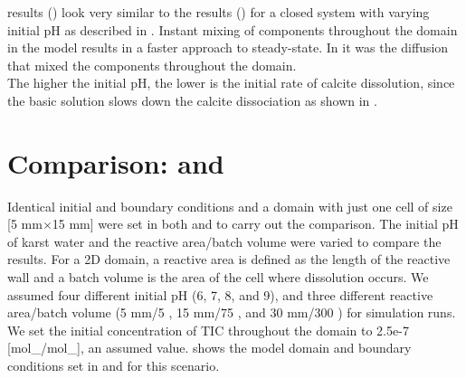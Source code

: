 \MATLAB results () look very similar to the \DuMuX results () 
for a closed system with varying initial pH as described in . Instant mixing of components throughout the domain 
in the \MATLAB model results in a faster approach to steady-state. In \DuMuX it was the diffusion that mixed the components throughout the domain. \\

The higher the initial pH, the lower is the initial rate of calcite dissolution, since the basic solution slows down the calcite dissociation 
as shown in .

\section{Comparison: \DuMuX and \MATLAB} \label{sec:dvm}
Identical initial and boundary conditions and a domain with just one cell of size [5 mm$\times$15 mm] were set in both \MATLAB and \DuMuX 
to carry out the comparison. The initial pH of karst water and the reactive area/batch volume were varied to compare the results. 
For a 2D domain, a reactive area is defined as the length of the reactive wall and a batch volume is the area of the cell where dissolution occurs. 
We assumed four different initial pH (6, 7, 8, and 9), and three different reactive area/batch 
volume (5 mm/5 , 15 mm/75 , and 30 mm/300 ) for simulation runs. We set the initial concentration of TIC 
throughout the domain to 2.5e-7 [mol\_/mol\_], 
an assumed value.  shows the model domain and boundary conditions set in \MATLAB and \DuMuX for this scenario. \\

